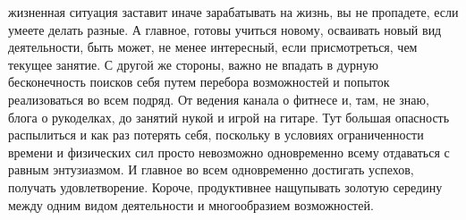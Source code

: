жизненная ситуация заставит иначе зарабатывать на жизнь, вы не пропадете, если
умеете делать разные. А главное, готовы учиться новому, осваивать новый вид
деятельности, быть может, не менее интересный, если присмотреться, чем текущее
занятие. С другой же стороны, важно не впадать в дурную бесконечность поисков
себя путем перебора возможностей и попыток реализоваться во всем подряд. От
ведения канала о фитнесе и, там, не знаю, блога о рукоделках, до занятий нукой и
игрой на гитаре. Тут большая опасность распылиться и как раз потерять себя,
поскольку в условиях ограниченности времени и физических сил просто невозможно
одновременно всему отдаваться с равным энтузиазмом. И главное во всем
одновременно достигать успехов, получать удовлетворение. Короче, продуктивнее
нащупывать золотую середину между одним видом деятельности и многообразием
возможностей. 

